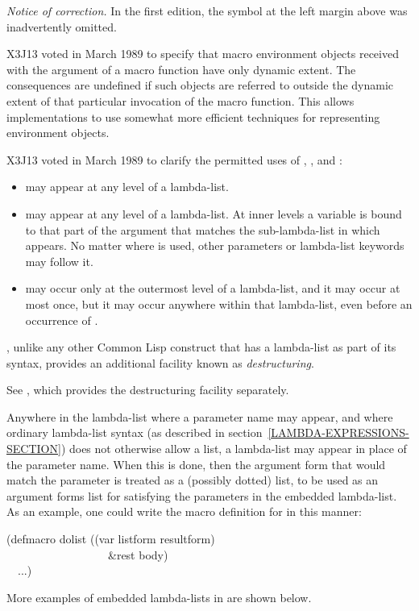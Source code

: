 \begin{defmac}
\begin{new}%
{\it Notice of correction.}
In the first edition, the symbol  at the
left margin above was inadvertently omitted.
\end{new}

\begin{newer}
X3J13 voted in March 1989 
to specify that macro environment objects received with the 
argument of a macro function
have only dynamic extent.  The consequences are undefined if such objects are
referred to outside the dynamic extent of that particular
invocation of the macro function.
This allows implementations to use somewhat more efficient techniques
for representing environment objects. 
\end{newer}

\begin{newer}
X3J13 voted in March 1989  to clarify the permitted
uses of , , and :
\begin{itemize}
\item {} may appear at any level of a  lambda-list.
\item {} may appear at any level of a  lambda-list.
At inner levels a  variable is bound to that part of the argument
that matches the sub-lambda-list in which  appears.  No matter where
 is used, other parameters or lambda-list keywords may follow it.
\item {} may occur only at the outermost level of a 
lambda-list, and it may occur at most once, but it may occur anywhere within
that lambda-list, even before an occurrence of .
\end{itemize}
\end{newer}

, unlike any other Common Lisp construct that has a lambda-list
as part of its syntax, provides an additional facility known as
{\it destructuring}.
\begin{newer}
See , which provides the destructuring facility separately.
\end{newer}
Anywhere in the lambda-list where a parameter
name may appear, and where ordinary lambda-list syntax (as described
in section~\ref{LAMBDA-EXPRESSIONS-SECTION}) does not
otherwise allow a list, a lambda-list may appear in place
of the parameter name.  When this is done, then the argument form
that would match the parameter is treated as a (possibly dotted) list,
to be used as an argument forms list for satisfying the
parameters in the embedded lambda-list.
As an example, one could write the macro definition
for  in this manner:
\begin{lisp}
(defmacro dolist ((var listform  resultform) \\
~~~~~~~~~~~~~~~~~~\&rest body) \\
~~...)
\end{lisp}
More examples of embedded lambda-lists in  are shown below.


\end{defmac}
